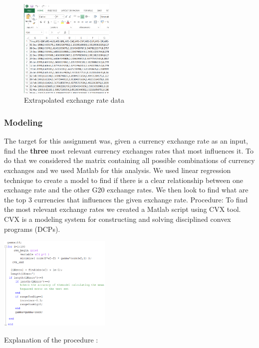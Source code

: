 \begin{figure}[!h]
	\begin{center}
		\includegraphics[width=0.4\textwidth]{bbb.png}
		\caption{Extrapolated exchange rate data}
		\label{extrap_ex_data}
	\end{center}
\end{figure}

\subsubsection{Modeling}
The target for this assignment was, given a currency exchange rate as an input, find the \textbf{three} most relevant currency exchanges rates that most influences it. To do that we considered the matrix containing all possible combinations of currency exchanges and we used Matlab for this analysis. We used linear regression technique to create a model to find if there is a clear relationship between one exchange rate and the other G20 exchange rates. We then look to find what are the top 3 currencies that influences the given exchange rate.
\newline
Procedure:
To find the most relevant exchange rates we created a Matlab script using CVX tool. CVX is a modeling system for constructing and solving disciplined convex programs (DCPs)\cite{leung2000forecasting}. 

\includegraphics[width=0.4\textwidth]{ccc.png}

Explanation of the procedure : 

